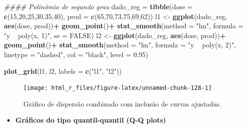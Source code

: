 \documentclass[
]{book}
\newenvironment{Shaded}{\begin{snugshade}}{\end{snugshade}}
\newcommand{\CommentTok}[1]{\textcolor[rgb]{0.56,0.35,0.01}{\textit{#1}}}
\newcommand{\DataTypeTok}[1]{\textcolor[rgb]{0.13,0.29,0.53}{#1}}
\newcommand{\DecValTok}[1]{\textcolor[rgb]{0.00,0.00,0.81}{#1}}
\newcommand{\FloatTok}[1]{\textcolor[rgb]{0.00,0.00,0.81}{#1}}
\newcommand{\KeywordTok}[1]{\textcolor[rgb]{0.13,0.29,0.53}{\textbf{#1}}}
\newcommand{\NormalTok}[1]{#1}
\newcommand{\OperatorTok}[1]{\textcolor[rgb]{0.81,0.36,0.00}{\textbf{#1}}}
\newcommand{\OtherTok}[1]{\textcolor[rgb]{0.56,0.35,0.01}{#1}}
\newcommand{\StringTok}[1]{\textcolor[rgb]{0.31,0.60,0.02}{#1}}
\providecommand{\tightlist}{%
  \setlength{\itemsep}{0pt}\setlength{\parskip}{0pt}}
\begin{document}
\begin{Shaded}
\begin{Highlighting}[]
\CommentTok{#### Polinômio de segundo grau}
\NormalTok{dado_reg =}\StringTok{ }\KeywordTok{tibble}\NormalTok{(}\DataTypeTok{dose =} \KeywordTok{c}\NormalTok{(}\DecValTok{15}\NormalTok{,}\DecValTok{20}\NormalTok{,}\DecValTok{25}\NormalTok{,}\DecValTok{30}\NormalTok{,}\DecValTok{35}\NormalTok{,}\DecValTok{40}\NormalTok{),}
                  \DataTypeTok{prod =} \KeywordTok{c}\NormalTok{(}\DecValTok{65}\NormalTok{,}\DecValTok{70}\NormalTok{,}\DecValTok{73}\NormalTok{,}\DecValTok{75}\NormalTok{,}\DecValTok{69}\NormalTok{,}\DecValTok{62}\NormalTok{))}
\NormalTok{l1 <-}\StringTok{ }\KeywordTok{ggplot}\NormalTok{(dado_reg, }\KeywordTok{aes}\NormalTok{(dose, prod))}\OperatorTok{+}
\StringTok{      }\KeywordTok{geom_point}\NormalTok{()}\OperatorTok{+}
\StringTok{      }\KeywordTok{stat_smooth}\NormalTok{(}\DataTypeTok{method =} \StringTok{"lm"}\NormalTok{,}
                  \DataTypeTok{formula =} \StringTok{"y ~ poly(x, 1)"}\NormalTok{,}
                  \DataTypeTok{se =} \OtherTok{FALSE}\NormalTok{)}
\NormalTok{l2 <-}\StringTok{ }\KeywordTok{ggplot}\NormalTok{(dado_reg, }\KeywordTok{aes}\NormalTok{(dose, prod))}\OperatorTok{+}
\StringTok{      }\KeywordTok{geom_point}\NormalTok{()}\OperatorTok{+}
\StringTok{      }\KeywordTok{stat_smooth}\NormalTok{(}\DataTypeTok{method =} \StringTok{"lm"}\NormalTok{,}
                  \DataTypeTok{formula =} \StringTok{"y ~ poly(x, 2)"}\NormalTok{,}
                  \DataTypeTok{linetype =} \StringTok{"dashed"}\NormalTok{,}
                  \DataTypeTok{col =} \StringTok{"black"}\NormalTok{,}
                  \DataTypeTok{level =} \FloatTok{0.95}\NormalTok{)}

\KeywordTok{plot_grid}\NormalTok{(l1, l2, }\DataTypeTok{labels =} \KeywordTok{c}\NormalTok{(}\StringTok{"l1"}\NormalTok{, }\StringTok{"l2"}\NormalTok{))}
\end{Highlighting}
\end{Shaded}

\begin{figure}

{\centering \texttt{[image: html\_r\_files/figure-latex/unnamed-chunk-128-1]} 

}

\caption{Gráfico de dispersão combinado com inclusão de curvas ajustadas.}\label{fig:unnamed-chunk-128}
\end{figure}

\begin{itemize}
\tightlist
\item
  \textbf{Gráficos do tipo quantil-quantil (Q-Q plots)}
\end{itemize}
\end{document}

